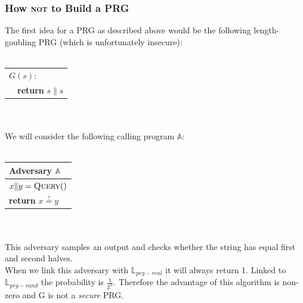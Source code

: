 \documentclass{article}
\begin{document}
\begin{adjustwidth}{2em}{2em}
\begin{adjustwidth}{2em}{2em}
				\subsubsection{How \textsc{not} to Build a PRG}
				\begin{adjustwidth}{2em}{}
					The first idea for a PRG as described above would be the following length-goubling PRG (which is unfortunately insecure): \\ \\
					\begin{tabular}{|l|}
						\hline
						\underline{$G(s):$} \\
						\ \ \textbf{return} $s \| s$ \\
						\hline
					\end{tabular} \\ \\
					We will consider the following calling program $\mathbb{A}$: \\ \\
					\begin{tabular}{|l|}
						\hline
						\cellcolor{gray!80} Adversary $\mathbb{A}$ \\
						\hline
						$x \| y = \textsc{Query}()$ \\
						\textbf{return} $x \stackrel{?}{=} y$ \\
						\hline
					\end{tabular} \\ \\
					This adversary samples an output and checks whether the string has equal first and second halves. \\
					When we link this adversary with $\mathbb{L}_{prg-real}$ it will always return 1. Linked to $\mathbb{L}_{prg-rand}$ the probability is $\frac{1}{2^{\lambda}}$. Therefore the advantage of this algorithm is non-zero and G is not a \textit{secure} PRG.
				\end{adjustwidth}
			\end{adjustwidth}

\end{adjustwidth}
\end{document}
